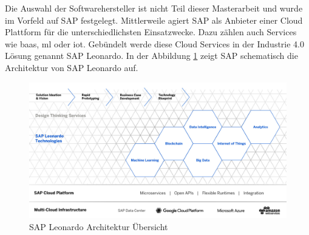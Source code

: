 Die Auswahl der Softwarehersteller ist nicht Teil dieser Masterarbeit und wurde im Vorfeld auf SAP festgelegt. Mittlerweile agiert SAP als Anbieter einer Cloud Plattform für die unterschiedlichsten Einsatzwecke.\cite{SAP2018} Dazu zählen auch Services wie \ac{baas}, \ac{ml} oder \ac{iot}. Gebündelt werde diese Cloud Services in der Industrie 4.0 Lösung genannt SAP Leonardo. In der Abbildung \ref{fig:sap-leonardo-innovation-system} zeigt SAP schematisch die Architektur von SAP Leonardo auf.

\begin{figure}[h!]
	\centering
	\includegraphics[width=0.9\linewidth]{pictures/sap-leonardo-innovation-system}
	\caption[SAP Leonardo Architektur Übersicht]{SAP Leonardo Architektur Übersicht\cite{Leonardo}}
	\label{fig:sap-leonardo-innovation-system}
\end{figure}

%
%

\newpage